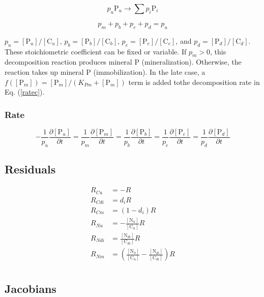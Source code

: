 \documentclass[12pt, a4paper]{article}
\begin{document}
\begin{equation}
p_u \text{P}_u \rightarrow \sum p_i \text{P}_i
\end{equation}

\begin{equation}
p_m + p_b + p_e + p_d = p_u
\end{equation}

$p_u = [\text{P}_u]/[\text{C}_u]$, $p_b = [\text{P}_b]/[\text{C}_b]$, $p_e = [\text{P}_e]/[\text{C}_e]$, and $p_d = [\text{P}_d]/[\text{C}_d]$. These stoichiometric coefficient can be fixed or variable. If $p_m > 0$, this decomposition reaction produces mineral P (mineralization). Otherwise, the reaction takes up mineral P (immobilization). In the late case, a $f([\text{P}_m])=[\text{P}_m]/(K_{Pm}+[\text{P}_m])$ term is added tothe decomposition rate in Eq. (\ref{ratec}).
\subsubsection{Rate}
\begin{equation}
-\frac{1}{p_u}\frac{\partial [\text{P}_u]}{\partial t} = \frac{1}{p_m}\frac{\partial [\text{P}_m]}{\partial t} = \frac{1}{p_b} \frac{\partial [\text{P}_b]}{\partial t} = \frac{1}{p_e} \frac{\partial [\text{P}_e]}{\partial t} = \frac{1}{p_d}\frac{\partial [\text{P}_d]}{\partial t}
\end{equation}

\subsection{Residuals}
\begin{align*}
R_{Cu} &=  -R \\
R_{Cdi} &=  d_i R \\
R_{Cm} &=  (1 - d_i) R \\
R_{Nu} &= -\frac{[\text{N}_u]}{[\text{C}_u]}R \\
R_{Ndi} &=  \frac{[\text{N}_{di}]}{[\text{C}_{di}]} R \\
R_{Nm} &=  \left(\frac{[\text{N}_u]}{[\text{C}_u]} - \frac{[\text{N}_{di}]}{[\text{C}_{di}]}\right) R \\
\end{align*}

\subsection{Jacobians}
\end{document}
